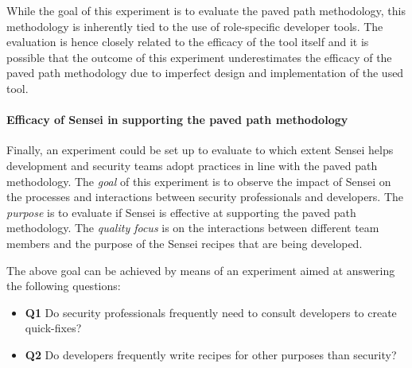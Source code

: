 While the goal of this experiment is to evaluate the paved path methodology, this methodology is inherently tied to the use of role-specific developer tools.
The evaluation is hence closely related to the efficacy of the tool itself and it is possible that the outcome of this experiment underestimates the efficacy of the paved path methodology due to imperfect design and implementation of the used tool.

\paragraph{Efficacy of Sensei in supporting the paved path methodology}
Finally, an experiment could be set up to evaluate to which extent Sensei helps development and security teams adopt practices in line with the paved path methodology.
The \textit{goal} of this experiment is to observe the impact of Sensei on the processes and interactions between security professionals and developers.
The \textit{purpose} is to evaluate if Sensei is effective at supporting the paved path methodology.
The \textit{quality focus} is on the interactions between different team members and the purpose of the Sensei recipes that are being developed.

The above goal can be achieved by means of an experiment aimed at answering the following questions:
\begin{itemize}
    \item \textbf{Q1} Do security professionals frequently need to consult developers to create quick-fixes?
    \item \textbf{Q2} Do developers frequently write recipes for other purposes than security?
\end{itemize}